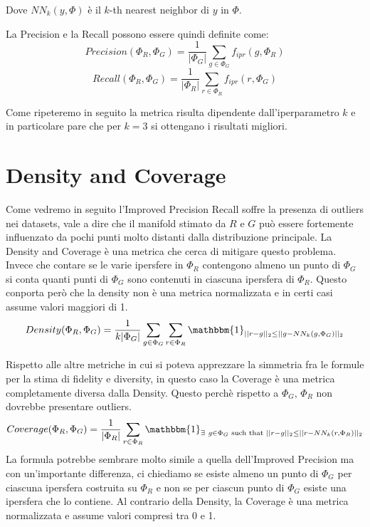 Dove $NN_k(y, \Phi)$ è il $k$-th nearest neighbor di $y$ in $\Phi$.

La Precision e la Recall possono essere quindi definite come:
\begin{equation}
    Precision(\Phi_R, \Phi_G) = \frac{1}{|\Phi_G|} \sum_{g \in \Phi_G} f_{ipr}(g, \Phi_R)
\end{equation}
\begin{equation}
    Recall(\Phi_R, \Phi_G) = \frac{1}{|\Phi_R|} \sum_{r \in \Phi_R} f_{ipr}(r, \Phi_G)
\end{equation}

Come ripeteremo in seguito la metrica risulta dipendente dall'iperparametro $k$ e in particolare pare che per $k=3$ si ottengano i risultati migliori.

\section{Density and Coverage}
\label{sec:density-and-coverage}

Come vedremo in seguito l'Improved Precision Recall soffre la presenza di outliers nei datasets, vale a dire che il manifold stimato da $R$ e $G$ può essere fortemente influenzato da pochi punti molto distanti dalla distribuzione principale.
La Density and Coverage è una metrica che cerca di mitigare questo problema. Invece che contare se le varie ipersfere in $\Phi_R$ contengono almeno un punto di $\Phi_G$ si conta quanti punti di $\Phi_G$ sono contenuti in ciascuna ipersfera di $\Phi_R$.
Questo conporta però che la density non è una metrica normalizzata e in certi casi assume valori maggiori di 1. 
\begin{equation}
    Density(\Phi_R, \Phi_G) = \frac{1}{k|\Phi_G|} \sum_{g \in \Phi_G} \sum_{r \in \Phi_R} \mathbbm{1}_{||r - g||_2 \leq ||g - NN_k(g, \Phi_G)||_2}
\end{equation}

Rispetto alle altre metriche in cui si poteva apprezzare la simmetria fra le formule per la stima di fidelity e diversity, in questo caso la Coverage è una metrica completamente diversa dalla Density. Questo perchè rispetto a $\Phi_G$, $\Phi_R$ non dovrebbe presentare outliers.
\begin{equation}
    Coverage(\Phi_R, \Phi_G) = \frac{1}{|\Phi_R|} \sum_{r \in \Phi_R} \mathbbm{1}_{\exists ~ g \in \Phi_G \text{ such that } ||r - g||_2 \leq ||r - NN_k(r, \Phi_R)||_2}
\end{equation}
La formula potrebbe sembrare molto simile a quella dell'Improved Precision ma con un'importante differenza, ci chiediamo se esiste almeno un punto di $\Phi_G$ per ciascuna ipersfera costruita su $\Phi_R$ e non se per ciascun punto di $\Phi_G$ esiste una ipersfera che lo contiene. 
Al contrario della Density, la Coverage è una metrica normalizzata e assume valori compresi tra 0 e 1.

